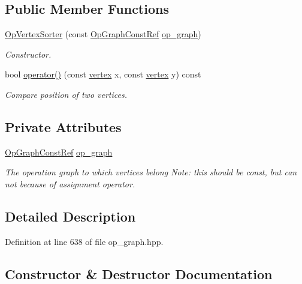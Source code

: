 \subsection*{Public Member Functions}
\begin{DoxyCompactItemize}
\item 
\hyperlink{classOpVertexSorter_a3cd2fcafd4d4cb02646523c5ac71be41}{Op\+Vertex\+Sorter} (const \hyperlink{op__graph_8hpp_a9a0b240622c47584bee6951a6f5de746}{Op\+Graph\+Const\+Ref} \hyperlink{classOpVertexSorter_a5ab4591ddca482da705841dbc649974b}{op\+\_\+graph})
\begin{DoxyCompactList}\small\item\em Constructor. \end{DoxyCompactList}\item 
bool \hyperlink{classOpVertexSorter_ad063d342c05cd002c65a51926697a27d}{operator()} (const \hyperlink{graph_8hpp_abefdcf0544e601805af44eca032cca14}{vertex} x, const \hyperlink{graph_8hpp_abefdcf0544e601805af44eca032cca14}{vertex} y) const
\begin{DoxyCompactList}\small\item\em Compare position of two vertices. \end{DoxyCompactList}\end{DoxyCompactItemize}
\subsection*{Private Attributes}
\begin{DoxyCompactItemize}
\item 
\hyperlink{op__graph_8hpp_a9a0b240622c47584bee6951a6f5de746}{Op\+Graph\+Const\+Ref} \hyperlink{classOpVertexSorter_a5ab4591ddca482da705841dbc649974b}{op\+\_\+graph}
\begin{DoxyCompactList}\small\item\em The operation graph to which vertices belong Note\+: this should be const, but can not because of assignment operator. \end{DoxyCompactList}\end{DoxyCompactItemize}


\subsection{Detailed Description}


Definition at line 638 of file op\+\_\+graph.\+hpp.



\subsection{Constructor \& Destructor Documentation}
\mbox{\label{classOpVertexSorter_a3cd2fcafd4d4cb02646523c5ac71be41}} 
